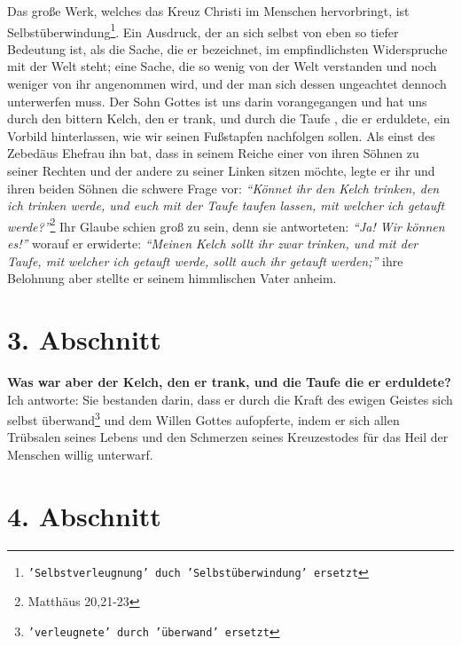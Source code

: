 Das große Werk, welches das Kreuz Christi im Menschen hervorbringt, ist
Selbstüberwindung\footnote{\texttt{'Selbstverleugnung' duch 'Selbstüberwindung'
ersetzt}}. Ein Ausdruck, der an sich selbst von eben so tiefer Bedeutung
ist, als die Sache, die er bezeichnet, im empfindlichsten Widerspruche mit der
Welt steht; eine Sache, die so wenig von der Welt verstanden und noch weniger
von ihr angenommen wird, und der man sich dessen ungeachtet dennoch unterwerfen
muss. Der Sohn Gottes ist uns darin vorangegangen und hat uns durch den bittern
Kelch, den er trank, und durch die Taufe , die er
erduldete, ein
Vorbild
hinterlassen, wie wir seinen Fußstapfen nachfolgen sollen. Als einst des
Zebedäus Ehefrau  ihn bat, dass in seinem
Reiche einer von ihren Söhnen zu
seiner Rechten und der andere zu seiner Linken sitzen möchte, legte er ihr und
ihren beiden Söhnen die schwere Frage vor:
\textit{"`Könnet ihr den Kelch trinken, den
ich trinken werde, und euch mit der Taufe taufen lassen, mit welcher ich
getauft werde?"'}\footnote{Matthäus  20,21-23}
Ihr Glaube schien groß zu sein, denn
sie antworteten:\textit{ "`Ja! Wir können es!"'} worauf er erwiderte:
  \textit{"`Meinen Kelch
sollt ihr zwar trinken, und mit der Taufe, mit welcher ich getauft werde, sollt
auch ihr getauft werden;"'} ihre Belohnung aber stellte er seinem himmlischen
Vater anheim.

\section{3. Abschnitt} \label{kap4_ab3}

 
\textbf{Was war aber der Kelch, den er trank, und die Taufe die er erduldete?}
Ich
antworte: Sie bestanden darin, dass er durch die Kraft des ewigen Geistes sich
selbst überwand\footnote{\texttt{'verleugnete' durch 'überwand' ersetzt}} und
dem
Willen Gottes aufopferte, indem er sich allen
Trübsalen seines Lebens und den Schmerzen seines Kreuzestodes für das Heil der
Menschen willig unterwarf.

\section{4. Abschnitt} \label{kap4_ab4}

